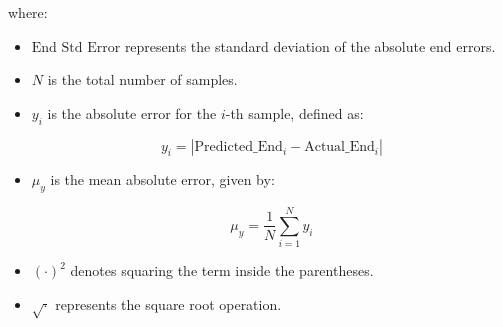 \documentclass[12pt]{report}
\begin{document}
where:
\begin{itemize}
	\item \(\text{End Std Error}\) represents the standard deviation of the absolute end errors.
	\item \( N \) is the total number of samples.
	\item \( y_i \) is the absolute error for the \( i \)-th sample, defined as:
	
	\[
	y_i = |\text{Predicted\_End}_i - \text{Actual\_End}_i|
	\]
	
	\item \( \mu_y \) is the mean absolute error, given by:
	
	\[
	\mu_y = \frac{1}{N} \sum_{i=1}^{N} y_i
	\]
	
	\item \( (\cdot)^2 \) denotes squaring the term inside the parentheses.
	\item \( \sqrt{\cdot} \) represents the square root operation.
\end{itemize}
\end{document}

